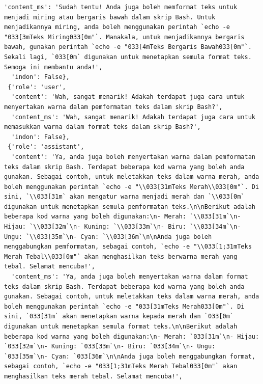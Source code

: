 \documentclass{article}
\begin{document}
\begin{lstlisting}[breaklines=true]
  'content_ms': 'Sudah tentu! Anda juga boleh memformat teks untuk menjadi miring atau bergaris bawah dalam skrip Bash. Untuk menjadikannya miring, anda boleh menggunakan perintah `echo -e "033[3mTeks Miring033[0m"`. Manakala, untuk menjadikannya bergaris bawah, gunakan perintah `echo -e "033[4mTeks Bergaris Bawah033[0m"`. Sekali lagi, `033[0m` digunakan untuk menetapkan semula format teks. Semoga ini membantu anda!',
  'indon': False},
 {'role': 'user',
  'content': 'Wah, sangat menarik! Adakah terdapat juga cara untuk menyertakan warna dalam pemformatan teks dalam skrip Bash?',
  'content_ms': 'Wah, sangat menarik! Adakah terdapat juga cara untuk memasukkan warna dalam format teks dalam skrip Bash?',
  'indon': False},
 {'role': 'assistant',
  'content': 'Ya, anda juga boleh menyertakan warna dalam pemformatan teks dalam skrip Bash. Terdapat beberapa kod warna yang boleh anda gunakan. Sebagai contoh, untuk meletakkan teks dalam warna merah, anda boleh menggunakan perintah `echo -e "\\033[31mTeks Merah\\033[0m"`. Di sini, `\\033[31m` akan mengatur warna menjadi merah dan `\\033[0m` digunakan untuk menetapkan semula pemformatan teks.\n\nBerikut adalah beberapa kod warna yang boleh digunakan:\n- Merah: `\\033[31m`\n- Hijau: `\\033[32m`\n- Kuning: `\\033[33m`\n- Biru: `\\033[34m`\n- Ungu: `\\033[35m`\n- Cyan: `\\033[36m`\n\nAnda juga boleh menggabungkan pemformatan, sebagai contoh, `echo -e "\\033[1;31mTeks Merah Tebal\\033[0m"` akan menghasilkan teks berwarna merah yang tebal. Selamat mencuba!',
  'content_ms': 'Ya, anda juga boleh menyertakan warna dalam format teks dalam skrip Bash. Terdapat beberapa kod warna yang boleh anda gunakan. Sebagai contoh, untuk meletakkan teks dalam warna merah, anda boleh menggunakan perintah `echo -e "033[31mTeks Merah033[0m"`. Di sini, `033[31m` akan menetapkan warna kepada merah dan `033[0m` digunakan untuk menetapkan semula format teks.\n\nBerikut adalah beberapa kod warna yang boleh digunakan:\n- Merah: `033[31m`\n- Hijau: `033[32m`\n- Kuning: `033[33m`\n- Biru: `033[34m`\n- Ungu: `033[35m`\n- Cyan: `033[36m`\n\nAnda juga boleh menggabungkan format, sebagai contoh, `echo -e "033[1;31mTeks Merah Tebal033[0m"` akan menghasilkan teks merah tebal. Selamat mencuba!',

\end{lstlisting}
\end{document}
